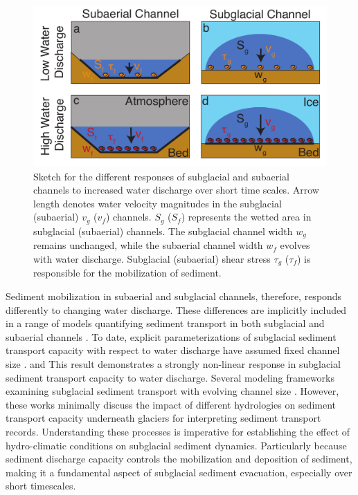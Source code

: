 \documentclass[esurf, manuscript]{copernicus}
\begin{document}
\begin{figure}[hbt!]
  \centering
  \includegraphics[width=0.6\linewidth]{Fig1.pdf}
  \caption{Sketch for the different responses of subglacial and subaerial channels to increased water discharge over short time scales.
    Arrow length denotes water velocity magnitudes in the subglacial (subaerial) $v_g$ ($v_f$) channels.
    $S_g$ ($S_f$) represents the wetted area in subglacial (subaerial) channels.
    The subglacial channel width $w_g$ remains unchanged, while the subaerial channel width $w_f$ evolves with water discharge.
    Subglacial (subaerial) shear stress $\tau_g$ ($\tau_f$) is responsible for the mobilization of sediment.
  }
  \label{fig:cartoon}
\end{figure}

Sediment mobilization in subaerial and subglacial channels, therefore, responds differently to changing water discharge.
These differences are implicitly included in a range of models quantifying sediment transport in both subglacial and subaerial channels  \citep[e.g.][]{walder1994,alley1997,tucker1997,creyts2013,beaud2018,delaney2019,hewitt2019,wickert2019}.
To date, explicit parameterizations of subglacial sediment transport capacity with respect to water discharge have assumed fixed channel size  \citep{alley1997}. and
This result demonstrates a strongly non-linear response in subglacial sediment transport capacity to water discharge.
Several modeling frameworks examining subglacial sediment transport with evolving channel size \citep{creyts2013,beaud2018,delaney2019,hewitt2019}.
However, these works minimally discuss the impact of different hydrologies on sediment transport capacity underneath glaciers for interpreting sediment transport records.
Understanding these processes is imperative for establishing the effect of hydro-climatic conditions on subglacial sediment dynamics.
Particularly because sediment discharge capacity controls the mobilization and deposition of sediment, making it a fundamental aspect of subglacial sediment evacuation, especially over short timescales.
\end{document}
